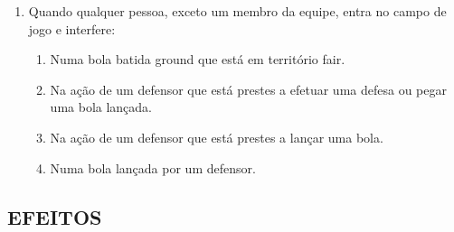 \begin{multicols}{2}
\begin{enumerate}[label=\alph*)]
\begin{enumerate}[label=\roman*.]
			\begin{enumerate}[label=\arabic*)]
				\item Passa sobre a cerca a uma dist\^ancia menor do que aquela prescrita na Regra *** 2, Anexo 1 (a) e Anexo ***1 (f) –essa dist\^ancia deve ser marcada para orienta\c{c}\~ao do \'arbitro. 
				\item Bate na luva ou no corpo do defensor e passa sobre a cerca em territ\'orio \gls{foul}. 
				\item Toca primeiro a cerca, desvia ap\'os ter conato com um defensor e depois passa sobre a cerca. 
				\item \'E tocada por um defensor, que est\'a em \'area de bola morta, e essa bola, na opini\~ao do \'arbitro, n\~ao teria passado sobre a cerca em territ\'orio \gls{fair}. 
			\end{enumerate}
		\end{enumerate}
		\item Quando qualquer pessoa, exceto um membro da equipe, entra no campo de jogo e interfere: 
		
		\begin{enumerate}[label=\roman*.]
			\item Numa bola batida \gls{ground} que est\'a em territ\'orio \gls{fair}. 
			\item  Na a\c{c}\~ao de um defensor que est\'a prestes a efetuar uma defesa ou pegar uma bola lan\c{c}ada. 
			\item  Na a\c{c}\~ao de um defensor que est\'a prestes a lan\c{c}ar uma bola. 
			\item  Numa bola lan\c{c}ada por um defensor. 
		\end{enumerate}
	\end{enumerate}
\end{multicols}

\subsection*{EFEITOS}

